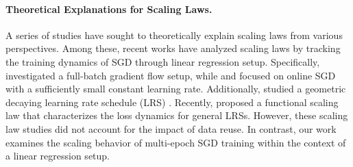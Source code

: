 \paragraph{Theoretical Explanations for Scaling Laws.} A series of studies \citep{sharma2020neuralscalinglawdimension,hutter2021learning,maloney2022solvable,wei2022more,jain2024scalinglawslearningreal,michaud2024quantization,nam2024exactly,atanasov2024scaling,dohmatob2024tale,bahri2024explaining,bordelon2024dynamical,lin2024scaling,paquette202543phasescomputeoptimalneural,bordelon2024feature,zhang2024does,ferbach2025dimension,li2025functional,li2026muon,li2026optimal,wang2026fast} have sought to theoretically explain scaling laws from various perspectives. Among these, recent works \citep{bordelon2024dynamical,paquette202543phasescomputeoptimalneural,lin2024scaling,bordelon2024feature} have analyzed scaling laws by tracking the training dynamics of SGD through linear regression setup. Specifically, \citet{bordelon2024dynamical} investigated a full-batch gradient flow setup, while \citet{paquette202543phasescomputeoptimalneural} and \citet{bordelon2024feature} focused on online SGD with a sufficiently small constant learning rate. Additionally, \citet{lin2024scaling} studied a geometric decaying learning rate schedule (LRS) \citep{ge2019step,wu2022iterateriskboundssgd}. Recently, \citet{li2025functional} proposed a functional scaling law that characterizes the loss dynamics for general LRSs. However, these scaling law studies did not account for the impact of data reuse. In contrast, our work examines the scaling behavior of multi-epoch SGD training within the context of a linear regression setup. 

